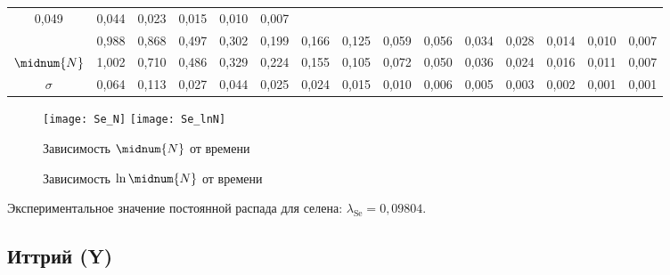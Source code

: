 \begin{table}[ht]
\begin{tabular}{|*{15}{C{.045}|}}
            0,049 & 0,044 & 0,023 & 0,015 & 0,010 & 0,007 \\ 
            & 0,988 & 0,868 & 0,497 & 0,302 & 0,199 & 0,166 & 0,125 & 0,059 &
            0,056 & 0,034 & 0,028 & 0,014 & 0,010 & 0,007 \\ \hline
            \( \midnum{N} \) & 1,002 & 0,710 & 0,486 & 0,329 & 0,224 & 0,155 &
            0,105 & 0,072 & 0,050 & 0,036 & 0,024 & 0,016 & 0,011 & 0,007
            \\ \hline
            \( \sigma \) & 0,064 & 0,113 & 0,027 & 0,044 & 0,025 & 0,024 &
            0,015 & 0,010 & 0,006 & 0,005 & 0,003 & 0,002 & 0,001 & 0,001 \\
            \hline
        \end{tabular}
    \end{table}
    
    \begin{figure}[h!]
        \center
        \texttt{[image: Se\_N]} \hfill
        \texttt{[image: Se\_lnN]}
        \parbox{.47\textwidth}{\caption{Зависимость \( \midnum{N} \) от времени}} \hfill
        \parbox{.47\textwidth}{\caption{Зависимость \( \ln \midnum{N} \) от времени}}
    \end{figure}

    Экспериментальное значение постоянной распада для селена:
    \( \lambda_\mathrm{Se} = 0,\!09804 \).

    \newpage

    \subsection{Иттрий (Y)}
    \vspace*{-1em}

